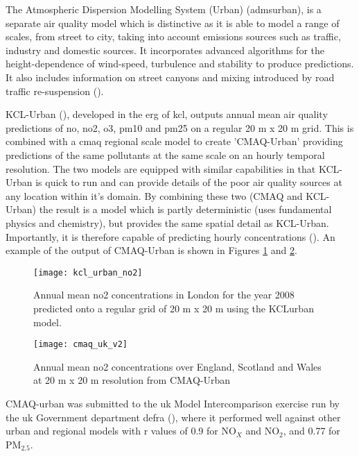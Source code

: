 The Atmospheric Dispersion Modelling System (Urban) (\gls{admsurban}), is a separate air quality model which is distinctive as it is able to model a range of scales, from street to city, taking into account emissions sources such as traffic, industry and domestic sources. It incorporates advanced algorithms for the height-dependence of wind-speed, turbulence and stability to produce predictions. It also includes information on street canyons and mixing introduced by road traffic re-suspension  (\cite{CambridgeEnvironmentalResearchCounsultantsCERC2014a}).

KCL-Urban (\cite{Beevers2013}), developed in the \gls{erg} of \gls{kcl}, outputs annual mean air quality predictions of \gls{no}, \gls{no2}, \gls{o3}, \gls{pm10} and \gls{pm25} on a regular 20 m x 20 m grid. This is combined with a \gls{cmaq} regional scale model to create 'CMAQ-Urban' providing predictions of the same pollutants at the same scale on an hourly temporal resolution. The two models are equipped with similar capabilities in that KCL-Urban is quick to run and can provide details of the poor air quality sources at any location within it's domain. By combining these two (CMAQ and KCL-Urban) the result is a model which is partly deterministic (uses fundamental physics and chemistry), but provides the same spatial detail as KCL-Urban. Importantly, it is therefore capable of predicting hourly concentrations (\cite{Beevers2013}). An example of the output of CMAQ-Urban is shown in Figures \ref{fig:kcl_urban_no2} and \ref{fig:cmaq_uk}.

\begin{figure}[H]
\centering
\texttt{[image: kcl\_urban\_no2]}
\caption{Annual mean \gls{no2} concentrations in London for the year 2008 predicted onto a regular grid of 20 m x 20 m using the KCLurban model.}
\label{fig:kcl_urban_no2}
\end{figure}

\begin{figure}[H]
\centering
\texttt{[image: cmaq\_uk\_v2]}
\caption{Annual mean \gls{no2} concentrations over England, Scotland and Wales at 20 m x 20 m resolution from CMAQ-Urban}
\label{fig:cmaq_uk}
\end{figure}

CMAQ-urban was submitted to the \gls{uk} Model Intercomparison exercise run by the \gls{uk} Government department \gls{defra} (\cite{Carslaw2013}), where it performed well against other urban and regional models with r values of 0.9 for NO$_{X}$ and NO$_{2}$, and 0.77 for PM$_{2.5}$.

